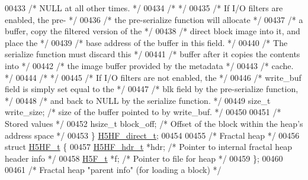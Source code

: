 \begin{DoxyCode}
00433                                 \textcolor{comment}{/* NULL at all other times.                    */}
00434                                 \textcolor{comment}{/*                                             */}
00435                                 \textcolor{comment}{/* If I/O filters are enabled, the pre-        */}
00436                                 \textcolor{comment}{/* the pre-serialize function will allocate    */}
00437                                 \textcolor{comment}{/* a buffer, copy the filtered version of the  */}
00438                                 \textcolor{comment}{/* direct block image into it, and place the   */}
00439                                 \textcolor{comment}{/* base address of the buffer in this field.   */}
00440                                 \textcolor{comment}{/* The serialize function must discard this    */}
00441                                 \textcolor{comment}{/* buffer after it copies the contents into    */}
00442                                 \textcolor{comment}{/* the image buffer provided by the metadata   */}
00443                                 \textcolor{comment}{/* cache.                                      */}
00444                                 \textcolor{comment}{/*                                             */}
00445                                 \textcolor{comment}{/* If I/O filters are not enabled, the         */}
00446                                 \textcolor{comment}{/* write\_buf field is simply set equal to the  */}
00447                                 \textcolor{comment}{/* blk field by the pre-serialize function,    */}
00448                                 \textcolor{comment}{/* and back to NULL by the serialize function. */}
00449     \textcolor{keywordtype}{size\_t}  write\_size;     \textcolor{comment}{/* size of the buffer pointed to by write\_buf. */}
00450 
00451     \textcolor{comment}{/* Stored values */}
00452     hsize\_t     block\_off;      \textcolor{comment}{/* Offset of the block within the heap's address space */}
00453 \} \hyperlink{struct_h5_h_f__direct__t}{H5HF\_direct\_t};
00454 
00455 \textcolor{comment}{/* Fractal heap */}
00456 \textcolor{keyword}{struct }\hyperlink{struct_h5_h_f__t}{H5HF\_t} \{
00457     \hyperlink{struct_h5_h_f__hdr__t}{H5HF\_hdr\_t}  *hdr;           \textcolor{comment}{/* Pointer to internal fractal heap header info */}
00458     \hyperlink{struct_h5_f__t}{H5F\_t}      *f;              \textcolor{comment}{/* Pointer to file for heap */}
00459 \};
00460 
00461 \textcolor{comment}{/* Fractal heap "parent info" (for loading a block) */}

\end{DoxyCode}
